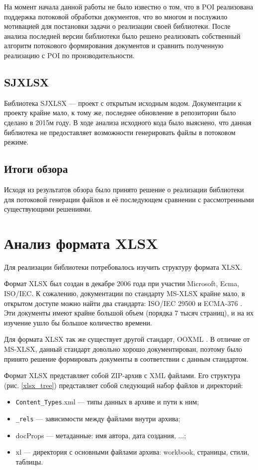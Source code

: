 \documentclass[14pt]{matmex-diploma-custom}
\begin{document}
    На момент начала данной работы не было известно о том, что в POI реализована поддержка потоковой обработки документов, что во многом и послужило мотивацией для постановки задачи о реализации своей библиотеки. После анализа последней версии библиотеки было решено реализовать собственный алгоритм потокового формирования документов и сравнить полученную реализацию с POI по производительности.
    
\subsection{SJXLSX}
    Библиотека SJXLSX \cite{sjxlsx}--- проект с открытым исходным кодом. Документации к проекту крайне мало, к тому же, последнее обновление в репозитории было сделано в 2015м году. В ходе анализа исходного кода было выяснено, что данная библиотека не предоставляет возможности генерировать файлы в потоковом режиме.
    
\subsection{Итоги обзора}
    Исходя из результатов обзора было принято решение о реализации библиотеки для потоковой генерации файлов и её последующем сравнении с рассмотренными существующими решениями.

\section{Анализ формата XLSX}
Для реализации библиотеки потребовалось изучить структуру формата XLSX.


Формат XLSX был создан в декабре 2006 года при участии Microsoft, Ecma, ISO/IEC. К сожалению, документации по стандарту MS-XLSX крайне мало, в открытом доступе можно найти два стандарта: ISO/IEC 29500 \cite{isostd} и ECMA-376 \cite{ecmastd}. Эти документы имеют крайне большой объем (порядка 7 тысяч страниц), и на их изучение ушло бы большое количество времени. 

Для формата XLSX так же существует другой стандарт, OOXML \cite{ooxml}. В отличие от MS-XLSX, данный стандарт довольно хорошо документирован, поэтому было принято решение формировать документы в соответствии с данным стандартом.

Формат XLSX представляет собой ZIP-архив с XML файлами. Его структура (рис. \ref{xlsx_tree}) представляет собой следующий набор файлов и директорий:
\begin{itemize}
    \item \texttt{Content\_Types}.xml --- типы данных в архиве и пути к ним;
    \item \texttt{\_rels} --- зависимости между файлами внутри архива;
    \item docProps --- метаданные: имя автора, дата создания, ...;
    \item xl --- директория с основными файлами архива: workbook, страницы, стили, таблицы.
\end{itemize}
\end{document}
